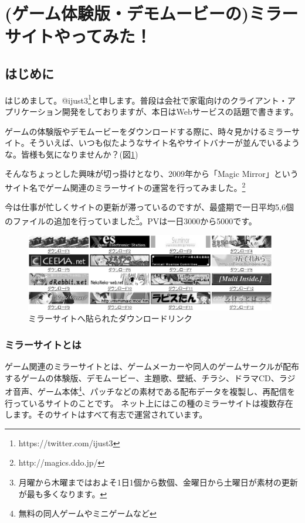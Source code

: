 \section{(ゲーム体験版・デモムービーの)ミラーサイトやってみた！}

\subsection{はじめに}
はじめまして。@ijust3\footnote{https://twitter.com/ijust3}と申します。普段は会社で家電向けのクライアント・アプリケーション開発をしておりますが、本日はWebサービスの話題で書きます。

ゲームの体験版やデモムービーをダウンロードする際に、時々見かけるミラーサイト。そういえば、いつも似たようなサイト名やサイトバナーが並んでいるような。皆様も気になりませんか？(図\ref{fig:mirrors})

そんなちょっとした興味が切っ掛けとなり、2009年から「Magic Mirror」というサイト名でゲーム関連のミラーサイトの運営を行ってみました。\footnote{http://magics.ddo.jp/}

今は仕事が忙しくサイトの更新が滞っているのですが、最盛期で一日平均5,6個のファイルの追加を行っていました\footnote{月曜から木曜まではおよそ1日1個から数個、金曜日から土曜日が素材の更新が最も多くなります。}。PVは一日3000から5000です。

\begin{figure}[hbp]
 \begin{center}
  \includegraphics[width=110mm]{ijust3-mirror/img/mirrors.eps}
 \end{center}
 \caption{ミラーサイトへ貼られたダウンロードリンク}
 \label{fig:mirrors}
\end{figure}

\subsubsection{ミラーサイトとは}

ゲーム関連のミラーサイトとは、ゲームメーカーや同人のゲームサークルが配布するゲームの体験版、デモムービー、主題歌、壁紙、チラシ、ドラマCD、ラジオ音声、ゲーム本体\footnote{無料の同人ゲームやミニゲームなど}、パッチなどの素材である配布データを複製し、再配信を行っているサイトのことです。%
ネット上にはこの種のミラーサイトは複数存在します。そのサイトはすべて有志で運営されています。

